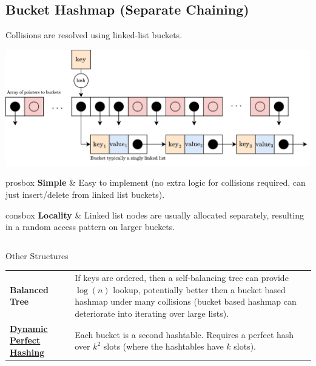 \subsection{Bucket Hashmap (Separate Chaining)}
Collisions are resolved using linked-list buckets.
\begin{center}
    \includegraphics[width=.9\textwidth]{algorithms_and_indices/images/bucket_hashmap.drawio.png}
\end{center}

\begin{tabbox}{prosbox}
    \textbf{Simple} & Easy to implement (no extra logic for collisions required, can just insert/delete from linked list buckets). \\
\end{tabbox}
\begin{tabbox}[.7\textwidth]{consbox}
    \textbf{Locality} & Linked list nodes are usually allocated separately, resulting in a random access pattern on larger buckets. \\
\end{tabbox}

\inputminted[firstline=21, lastline=135]{cpp}{algorithms_and_indices/code/hashtable_comparison/hashtables/bucket.h}

\begin{sidenotebox}{Other Structures}
    \begin{center}
        \begin{tabular}{l p{}}
            \textbf{Balanced Tree}                                                                         & If keys are ordered, then a self-balancing tree can provide $\log (n) $ lookup, potentially better then a bucket based hashmap under many collisions (bucket based hashmap can deteriorate into iterating over large lists). \\
            \textbf{\href{https://en.wikipedia.org/wiki/Dynamic_perfect_hashing}{Dynamic Perfect Hashing}} & Each bucket is a second hashtable. Requires a perfect hash over $k^2$ slots (where the hashtables have $k$ slots).                                                                                                           \\
        \end{tabular}
    \end{center}
\end{sidenotebox}

